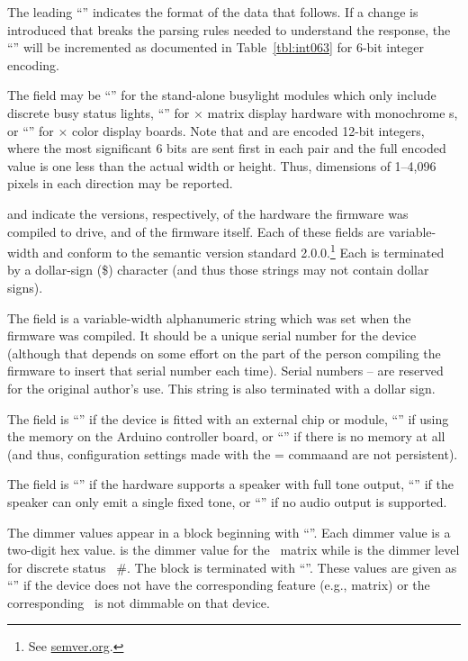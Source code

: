 The leading ``'' indicates the format of the data that follows. If a change is introduced
that breaks the parsing rules needed to understand the response, the ``'' will be incremented
as documented in Table~\ref{tbl:int063} for 6-bit integer encoding.

The  field may be %
``'' for the stand-alone busylight modules which only include discrete busy status lights,
``'' for $\times$ matrix display hardware with monochrome \led s, or
``'' for $\times$  color display boards.
Note that  and  are encoded 12-bit integers, where the most significant 6 bits
are sent first in each pair and the full encoded value is one less than the actual width or height.
Thus, dimensions of 1--4,096 pixels in each direction may be reported.

 and  indicate the versions, respectively, of the 
hardware the firmware was compiled to drive, and of the firmware itself. Each of
these fields are variable-width and conform to the semantic version standard 2.0.0.\footnote{See
\href{https://semver.org}{semver.org}.} Each is terminated by a dollar-sign (\z\$) character (and
thus those strings may not contain dollar signs).

The  field is a variable-width alphanumeric string which was set when the firm\-ware was
compiled. It should be a unique serial number for the device (although that depends on
some effort on the part of the person compiling the firmware to insert that serial number
each time). Serial numbers -- are reserved for the original author's use. This string is also
terminated with a dollar sign.

The  field is ``'' if the device is fitted with an external  chip or module,
``'' if using the  memory on the Arduino controller board, or ``\z{\_}'' if there
is no  memory at all (and thus, configuration settings made with the \z= commaand
are not persistent).

The  field is ``'' if the hardware supports a speaker with full tone output, ``''
if the speaker can only emit a single fixed tone, or ``\z{\_}'' if no audio output is supported.

The dimmer values appear in a block beginning with ``''. Each dimmer value is a two-digit hex
value.  is the dimmer value for the \led\ matrix while
 is the dimmer level for discrete status \led\ \#. The block is terminated with ``\z{\$}''.
These values are given as ``\z{\_\_}'' if the device does not have the corresponding feature (e.g., matrix)
or the corresponding \led\ is not dimmable on that device.

